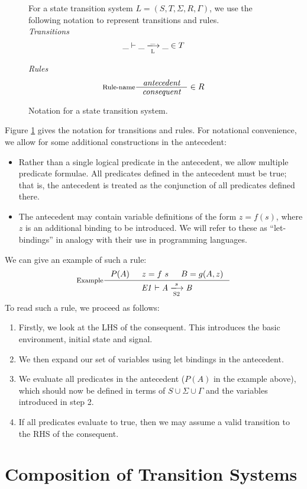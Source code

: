 \documentclass[11pt,a4paper]{article}
\newcommand{\trans}[2]{\xlongrightarrow[\textsc{#1}]{#2}}
\theoremstyle{definition}
\theoremstyle{remark}
\begin{document}
\begin{figure}[h]
  \label{fig:notation}
  For a state transition system $L=(S,T,\Sigma, R, \Gamma)$, we use the
  following notation to represent transitions and rules. \\

  \textit{Transitions}
  \[ \_ \vdash \_ \trans{L}{\_} \_ \in T \]

  \textit{Rules}
  \[ \inference[Rule-name]
     {\textit{antecedent}}
     {\textit{consequent}}
     \in R
  \]
  \caption{Notation for a state transition system.}
\end{figure}
Figure \ref{fig:notation} gives the notation for transitions and rules. For
notational convenience, we allow for some additional constructions in the
antecedent:
\begin{itemize}
  \item Rather than a single logical predicate in the antecedent, we allow
    multiple predicate formulae. All predicates defined in the antecedent must be
    true; that is, the antecedent is treated as the conjunction of all predicates defined
    there.
  \item The antecedent may contain variable definitions of the form $z=f(s)$,
    where $z$ is an additional binding to be introduced. We will refer to these
    as ``let-bindings'' in analogy with their use in programming languages.
  \end{itemize}
We can give an example of such a rule:
  \[ \inference[Example]
    {P(A) & z = f ~ s & B = g(A,z)}
    {\tion[E1]{S2}{A}{s}{B}}
  \]
To read such a rule, we proceed as follows:
\begin{enumerate}
  \item Firstly, we look at the LHS of the consequent. This introduces the basic
    environment, initial state and signal.
  \item We then expand our set of variables using let bindings in the
    antecedent.
  \item We evaluate all predicates in the antecedent ($P(A)$ in the example above), which should now be
    defined in terms of $S\cup\Sigma\cup\Gamma$ and the variables introduced in
    step 2.
  \item If all predicates evaluate to true, then we may assume a valid
    transition to the RHS of the consequent.
\end{enumerate}
\section{Composition of Transition Systems}
\end{document}
